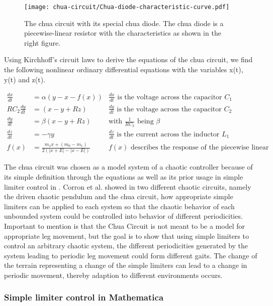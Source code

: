 \documentclass[main]{subfiles}
\begin{document}
\begin{figure}[H]
\centering

\texttt{[image: chua-circuit/Chua-diode-characteristic-curve.pdf]}
\caption[The chua circuit]{The chua circuit with its special chua diode. The chua diode is a piecewise-linear resistor with the characteristics as shown in the right figure.}
\label{figure:chuacircuit}
\end{figure}

Using Kirchhoff's circuit laws to derive the equations of the chua circuit, we find the following nonlinear ordinary differential equations with the variables x(t), y(t) and z(t).

\begin{align*}
\frac{dx}{dt}&=\alpha (y-x-f(x)) &\frac{dx}{dt}\text{ is the voltage across the capacitor }C_1\\
RC_2\frac{dy}{dt}&= (x-y+Rz) &\frac{dy}{dt}\text{ is the voltage across the capacitor }C_2\\
\frac{dy}{dt}&=\beta (x-y+Rz) &\text{with } \frac{1}{RC_2} \text{ being }\beta\\
\frac{dz}{dt}&=-\gamma y &\frac{dz}{dt}\text{ is the current across the inductor }L_1\\
f (x) &= \frac{m_1 x + (m_0 - m_1)}{2 (| x + E | -| x - E |)} &f(x)\text{ describes the response of the piecewise linear resistor}
\end{align*}

The chua circuit was chosen as a model system of a chaotic controller because of its simple definition through the equations as well as its prior usage in simple limiter control in \cite{bib:Corron2000}. Corron et al. showed in two different chaotic circuits, namely the driven chaotic pendulum and the chua circuit, how appropriate simple limiters can be applied to each system so that the chaotic behavior of each unbounded system could be controlled into behavior of different periodicities. Important to mention is that the Chua Circuit is not meant to be a model for appropriate leg movement, but the goal is to show that using simple limiters to control an arbitrary chaotic system, the different periodicities generated by the system leading to periodic leg movement could form different gaits. The change of the terrain representing a change of the simple limiters can lead to a change in periodic movement, thereby adaption to different environments occurs. 

\subsubsection{Simple limiter control in Mathematica}
\label{subsubsec:simple-limiter-mathematica}
\end{document}
